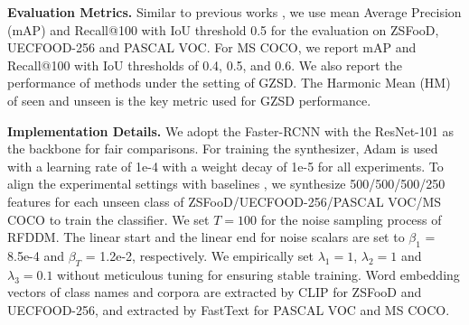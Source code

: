 \noindent\textbf{Evaluation Metrics.}
Similar to previous works \cite{bansal2018zero, huang2022robust}, we use mean Average Precision (mAP) and Recall@100 with IoU threshold 0.5 for the evaluation on ZSFooD, UECFOOD-256 and PASCAL VOC. For MS COCO, we report mAP and Recall@100 with IoU thresholds of 0.4, 0.5, and 0.6. We also report the performance of methods under the setting of GZSD. The Harmonic Mean (HM) of seen and unseen is the key metric used for GZSD performance. 

\noindent\textbf{Implementation Details.}
We adopt the Faster-RCNN \cite{fasterrcnn} with the ResNet-101 \cite{resnet} as the backbone for fair comparisons. For training the synthesizer, Adam \cite{adam2014} is used with a learning rate of 1e-4 with a weight decay of 1e-5 for all experiments. To align the experimental settings with baselines \cite{hayat2020synthesizing,huang2022robust}, we synthesize 500/500/500/250 features for each unseen class of ZSFooD/UECFOOD-256/PASCAL VOC/MS COCO to train the classifier. We set $T = 100$ for the noise sampling process of RFDDM. The linear start and the linear end for noise scalars are set to $\beta_1$ = 8.5e-4 and $\beta_T$ = 1.2e-2, respectively. We empirically set $\lambda_1 = 1$, $\lambda_2 = 1$ and $\lambda_3 = 0.1$ without meticulous tuning for ensuring stable training. Word embedding vectors of class names and corpora are extracted by CLIP \cite{radford2021learning} for ZSFooD and UECFOOD-256, and extracted by FastText \cite{mikolov2018advances} for PASCAL VOC and MS COCO.


\begin{table}[!t]
  \centering
  \renewcommand{\arraystretch}{0.75}
  \caption{Comparison of mAP on PASCAL VOC (\%).}
  \label{tab:voc}\end{table}

